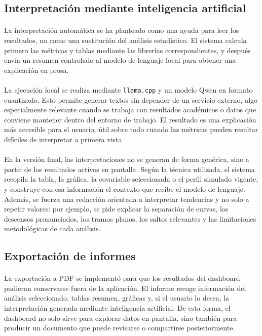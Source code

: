 \subsection{Interpretación mediante inteligencia artificial}

\paragraph*{}
La interpretación automática se ha planteado como una ayuda para leer los resultados, no como una sustitución del análisis estadístico. El sistema calcula primero las métricas y tablas mediante las librerías correspondientes, y después envía un resumen controlado al modelo de lenguaje local para obtener una explicación en prosa.

\paragraph*{}
La ejecución local se realiza mediante \texttt{llama.cpp} y un modelo Qwen en formato cuantizado. Esto permite generar textos sin depender de un servicio externo, algo especialmente relevante cuando se trabaja con resultados académicos o datos que conviene mantener dentro del entorno de trabajo. El resultado es una explicación más accesible para el usuario, útil sobre todo cuando las métricas pueden resultar difíciles de interpretar a primera vista.

\paragraph*{}
En la versión final, las interpretaciones no se generan de forma genérica, sino a partir de los resultados activos en pantalla. Según la técnica utilizada, el sistema recopila la tabla, la gráfica, la covariable seleccionada o el perfil simulado vigente, y construye con esa información el contexto que recibe el modelo de lenguaje. Además, se fuerza una redacción orientada a interpretar tendencias y no solo a repetir valores: por ejemplo, se pide explicar la separación de curvas, los descensos pronunciados, los tramos planos, los saltos relevantes y las limitaciones metodológicas de cada análisis.

\subsection{Exportación de informes}

\paragraph*{}
La exportación a PDF se implementó para que los resultados del dashboard pudieran conservarse fuera de la aplicación. El informe recoge información del análisis seleccionado, tablas resumen, gráficas y, si el usuario lo desea, la interpretación generada mediante inteligencia artificial. De esta forma, el dashboard no solo sirve para explorar datos en pantalla, sino también para producir un documento que puede revisarse o compartirse posteriormente.

